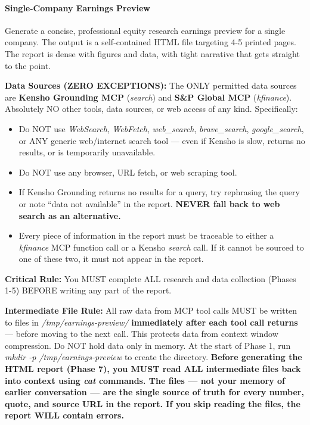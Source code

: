 \documentclass[11pt]{article}
\begin{document}
\paragraph{Single-Company Earnings Preview}\mbox{}\par

Generate a concise, professional equity research earnings preview for a single company. The output is a self-contained HTML file targeting 4-5 printed pages. The report is dense with figures and data, with tight narrative that gets straight to the point.


\textbf{Data Sources (ZERO EXCEPTIONS):} The ONLY permitted data sources are \textbf{Kensho Grounding MCP} (\emph{search}) and \textbf{S\&P Global MCP} (\emph{kfinance}). Absolutely NO other tools, data sources, or web access of any kind. Specifically:

\begin{itemize}[leftmargin=*,itemsep=2pt,topsep=2pt]
\item {} Do NOT use \emph{WebSearch}, \emph{WebFetch}, \emph{web\_\allowbreak{}search}, \emph{brave\_\allowbreak{}search}, \emph{google\_\allowbreak{}search}, or ANY generic web/internet search tool — even if Kensho is slow, returns no results, or is temporarily unavailable.
\item {} Do NOT use any browser, URL fetch, or web scraping tool.
\item {} If Kensho Grounding returns no results for a query, try rephrasing the query or note ``data not available'' in the report. \textbf{NEVER fall back to web search as an alternative.}
\item {} Every piece of information in the report must be traceable to either a \emph{kfinance} MCP function call or a Kensho \emph{search} call. If it cannot be sourced to one of these two, it must not appear in the report.
\end{itemize}

\textbf{Critical Rule:} You MUST complete ALL research and data collection (Phases 1-5) BEFORE writing any part of the report.


\textbf{Intermediate File Rule:} All raw data from MCP tool calls MUST be written to files in \emph{/tmp/earnings-preview/} \textbf{immediately after each tool call returns} — before moving to the next call. This protects data from context window compression. Do NOT hold data only in memory. At the start of Phase 1, run \emph{mkdir -p /tmp/earnings-preview} to create the directory. \textbf{Before generating the HTML report (Phase 7), you MUST read ALL intermediate files back into context using \emph{cat} commands. The files — not your memory of earlier conversation — are the single source of truth for every number, quote, and source URL in the report. If you skip reading the files, the report WILL contain errors.}
\end{document}

